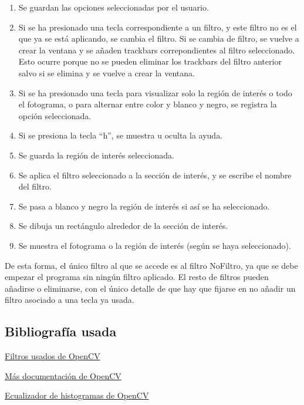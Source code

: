 \documentclass[12pt]{article}
\begin{document}
\begin{enumerate}
    \item Se guardan las opciones seleccionadas por el usuario.
    \item Si se ha presionado una tecla correspondiente a un filtro, y este filtro no es el que ya se está aplicando, se cambia el filtro. Si se cambia de filtro, se vuelve a crear la ventana y se añaden trackbars correpondientes al filtro seleccionado. Esto ocurre porque no se pueden eliminar los trackbars del filtro anterior salvo si se elimina y se vuelve a crear la ventana.
    \item Si se ha presionado una tecla para visualizar solo la región de interés o todo el fotograma, o para alternar entre color y blanco y negro, se registra la opción seleccionada.
    \item Si se presiona la tecla ``h'', se muestra u oculta la ayuda.
    \item Se guarda la región de interés seleccionada.
    \item Se aplica el filtro seleccionado a la sección de interés, y se escribe el nombre del filtro.
    \item Se pasa a blanco y negro la región de interés si así se ha seleccionado.
    \item  Se dibuja un rectángulo alrededor de la sección de interés.
    \item Se muestra el fotograma o la región de interés (según se haya seleccionado).
\end{enumerate}

De esta forma, el único filtro al que se accede es al filtro NoFiltro, ya que se debe empezar el programa sin ningún filtro aplicado. El resto de filtros pueden añadirse o eliminarse, con el único detalle de que hay que fijarse en no añadir un filtro asociado a una tecla ya usada.

\subsection*{Bibliografía usada}

\href{https://docs.opencv.org/4.x/d4/d13/tutorial_py_filtering.html}{Filtros usados de OpenCV}

\href{https://docs.opencv.org/4.x/d4/d86/group__imgproc__filter.html#ga564869aa33e58769b4469101aac458f9}{Más documentación de OpenCV}

\href{https://docs.opencv.org/3.4/d4/d1b/tutorial_histogram_equalization.html}{Ecualizador de histogramas de OpenCV}
\end{document}
